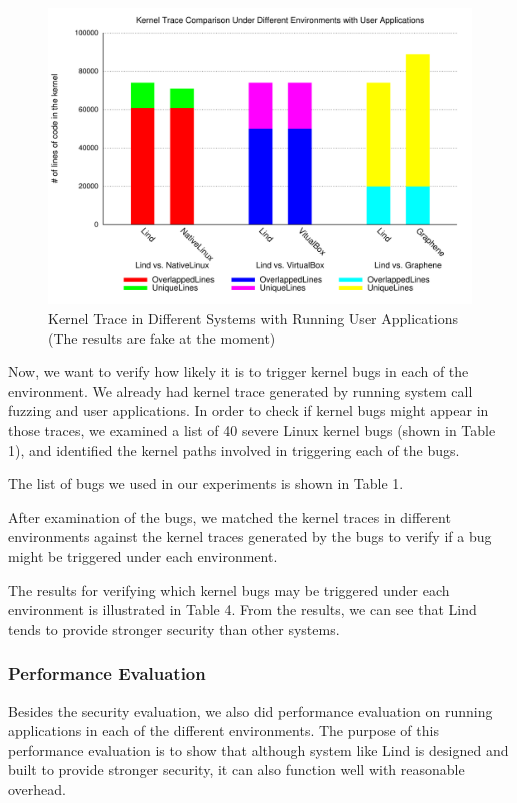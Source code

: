 \begin{figure}[h]
\centering
\includegraphics[width=1.0\columnwidth]{diagram/lind_ccs15_diagram_04.pdf}
\caption{Kernel Trace in Different Systems with Running User Applications {\color{red}(The results are fake at the moment)}}
\label{fig:different_systems_userapplications_trace}
\end{figure}

Now, we want to verify how likely it is to trigger kernel bugs in each of the environment.
We already had kernel trace generated by running system call fuzzing and user applications.
In order to check if kernel bugs might appear in those traces, we examined a list of 40 severe Linux 
kernel bugs (shown in Table 1), and identified the kernel paths involved in triggering each of the bugs.

The list of bugs we used in our experiments is shown in Table 1.

After examination of the bugs, we matched the kernel traces in different environments against the kernel traces generated 
by the bugs to verify if a bug might be triggered under each environment. 

The results for verifying which kernel bugs may be triggered under each environment is illustrated in Table 4.
From the results, we can see that Lind tends to provide stronger security than other systems.  

\subsubsection{Performance Evaluation}
Besides the security evaluation, we also did performance evaluation on running applications in each of the different environments.
The purpose of this performance evaluation is to show that although system like Lind is designed and built to provide stronger
security, it can also function well with reasonable overhead. 

